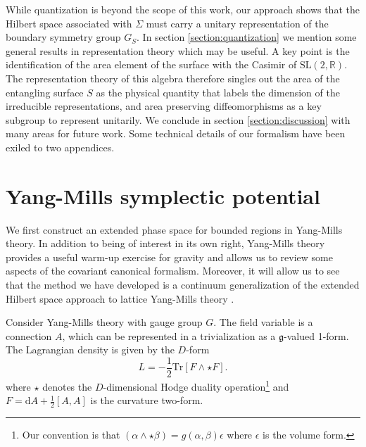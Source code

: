 \documentclass[a4paper,11pt]{article}
\def\rd{\mathrm{d}}
\newcommand{\Tr}{\mbox{Tr}}
\newcommand{\slr}{\text{SL}(2,\mathbb{R})}
\begin{document}
While quantization is beyond the scope of this work, our approach shows that the Hilbert space associated with $\Sigma$ must carry a unitary representation of the boundary symmetry group $G_S$. In section \ref{section:quantization} we mention some general results in representation theory which may be useful.
A key point is the identification of the area element of the surface with the Casimir of $\slr$.
The representation theory of this algebra therefore singles out the area of the entangling surface $S$ as the physical quantity that labels the dimension of the irreducible representations, and area preserving diffeomorphisms as a key subgroup to represent unitarily.
We conclude in section \ref{section:discussion} with many areas for future work.
Some technical details of our formalism have been exiled to two appendices.

\section{Yang-Mills symplectic potential} \label{section:ym}

We first construct an extended phase space for bounded regions in Yang-Mills theory.
In addition to being of interest in its own right, Yang-Mills theory provides a useful warm-up exercise for gravity and allows us to review some aspects of the covariant canonical formalism.
Moreover, it will allow us to see that the method we have developed is a continuum generalization of the extended Hilbert space approach to lattice Yang-Mills theory \cite{Buividovich:2008gq,Donnelly2011,Ghosh:2015iwa,Aoki:2015bsa,Soni:2015yga}.

Consider Yang-Mills theory with gauge group $G$.
The field variable is a connection $A$, which can be represented in a trivialization as a $\mathfrak{g}$-valued 1-form.
The Lagrangian density is given by the $D$-form
\begin{equation}
L = -\frac{1}{2} \Tr[ F \wedge \star F] .
\end{equation}
where $\star$ denotes the $D$-dimensional Hodge duality operation\footnote{Our convention is that $(\alpha \wedge \star \beta) = g(\alpha,\beta) \epsilon$ where $\epsilon$ is the volume form.} and $F=\rd A + \frac12 [A,A]$ is the curvature two-form.
\end{document}
